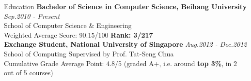 \documentclass{resume} %
\begin{document}

\begin{rSection}{Education}
{\bf Bachelor of Science in Computer Science, Beihang University} \hfill {\em Sep.2010 - Present} \\
School of Computer Science \& Engineering \\
Weighted Average Score: 90.15/100 \textbf{Rank: 3/217}\\
{\bf Exchange Student, National University of Singapore} \hfill {\em Aug.2012 - Dec.2012} \\
School of Computing \hfill Supervised by Prof. Tat-Seng Chua \\
Cumulative Grade Average Point: 4.8/5 (graded A+, i.e. around \textbf{top 3\%}, in 2 out of 5 courses) \\

\end{rSection}

\end{document}

